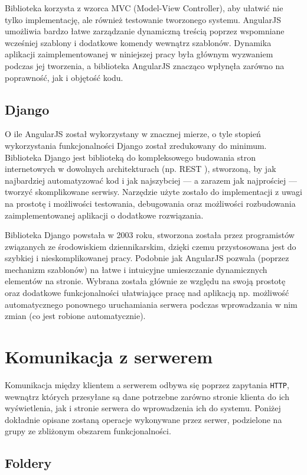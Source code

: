 Biblioteka korzysta z wzorca MVC (Model-View Controller), aby ułatwić nie tylko implementację, ale również testowanie tworzonego systemu. AngularJS umożliwia bardzo łatwe zarządzanie dynamiczną treścią poprzez wspomniane wcześniej szablony i dodatkowe komendy wewnątrz szablonów. Dynamika aplikacji zaimplementowanej w niniejszej pracy była głównym wyzwaniem podczas jej tworzenia, a biblioteka AngularJS znacząco wpłynęła zarówno na poprawność, jak i objętość kodu.

\subsection*{Django}

O ile AngularJS został wykorzystany w znacznej mierze, o tyle stopień wykorzystania funkcjonalności Django został zredukowany do minimum. Biblioteka Django jest biblioteką do kompleksowego budowania stron internetowych w dowolnych architekturach (np. REST \cite{rest}), stworzoną, by jak najbardziej automatyzować kod i jak najszybciej --- a zarazem jak najprościej --- tworzyć skomplikowane serwisy. Narzędzie użyte zostało do implementacji z uwagi na prostotę i możliwości testowania, debugowania oraz możliwości rozbudowania zaimplementowanej aplikacji o dodatkowe rozwiązania.

Biblioteka Django powstała w 2003 roku, stworzona została przez programistów związanych ze środowiskiem dziennikarskim, dzięki czemu przystosowana jest do szybkiej i nieskomplikowanej pracy. Podobnie jak AngularJS pozwala (poprzez mechanizm szablonów) na łatwe i intuicyjne umieszczanie dynamicznych elementów na stronie. Wybrana została głównie ze względu na swoją prostotę oraz dodatkowe funkcjonalności ułatwiające pracę nad aplikacją np. możliwość automatycznego ponownego uruchamiania serwera podczas wprowadzania w nim zmian (co jest robione automatycznie).

\section{Komunikacja z serwerem}

Komunikacja między klientem a serwerem odbywa się poprzez zapytania \texttt{HTTP}, wewnątrz których przesyłane są dane potrzebne zarówno stronie klienta do ich wyświetlenia, jak i stronie serwera do wprowadzenia ich do systemu. Poniżej dokładnie opisane zostaną operacje wykonywane przez serwer, podzielone na grupy ze zbliżonym obszarem funkcjonalności.

\subsection{Foldery}

